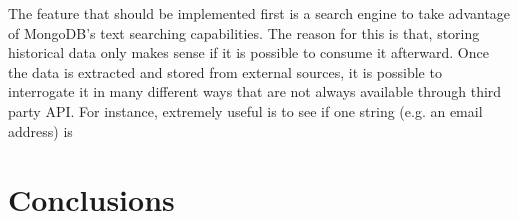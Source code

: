 The feature that should be implemented first is a search engine to take
advantage of MongoDB's text searching capabilities. The reason for this is that,
storing historical data only makes sense if it is possible to consume it
afterward. Once the data is extracted and stored from external sources, it is
possible to interrogate it in many different ways that are not always available
through third party API. For instance, extremely useful is to see if one string
(e.g.
an email address) is 

\section{Conclusions}

